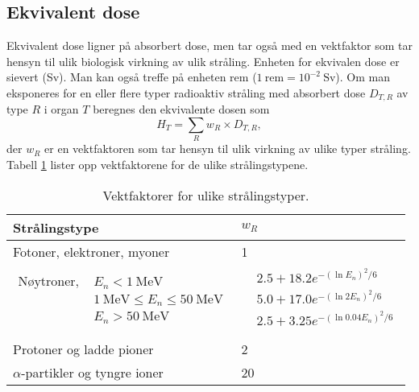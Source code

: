 \subsection{Ekvivalent dose}
Ekvivalent dose ligner på absorbert dose, men tar også med en vektfaktor som tar hensyn til ulik biologisk virkning av ulik stråling. Enheten for ekvivalen dose er sievert (Sv). Man kan også treffe på enheten rem ($1~\mathrm{rem} = 10^{-2}~\mathrm{Sv}$). Om man eksponeres for en eller flere typer radioaktiv stråling med absorbert dose $D_{T,R}$ av type $R$ i organ $T$ beregnes den ekvivalente dosen som
\begin{equation}
	H_T = \sum_R w_R\times D_{T,R},
\end{equation}
der $w_R$ er en vektfaktoren som tar hensyn til ulik virkning av ulike typer stråling. Tabell \ref{tab:radioaktiv:wR} lister opp vektfaktorene for de ulike strålingstypene.
\begin{table}[tp]
\begin{center}
{\footnotesize
	\begin{tabular}{ll}
	\hline
	\hline
	Strålingstype & $w_R$ \\
	\hline
	Fotoner, elektroner, myoner & 1 \\
	$\begin{aligned}
		\text{Nøytroner, } &E_n < 1~\mathrm{MeV} \\
		&1~\mathrm{MeV}\leq E_n \leq 50~\mathrm{MeV} \\
		&E_n > 50~\mathrm{MeV}
	\end{aligned}$& 
	$\begin{aligned}
		&2.5 + 18.2e^{-(\ln E_n)^2/6} \\
		&5.0 + 17.0e^{-(\ln 2E_n)^2/6} \\
		&2.5 + 3.25e^{-(\ln 0.04E_n)^2/6} \\
	\end{aligned}$\\
	Protoner og ladde pioner & 2 \\
	$\alpha$-partikler og tyngre ioner & 20 \\
	\hline
	\hline
	\end{tabular}
}
\end{center}
\caption{Vektfaktorer for ulike strålingstyper. \cite{Agashe:2014kda}}
\label{tab:radioaktiv:wR}
\end{table}


